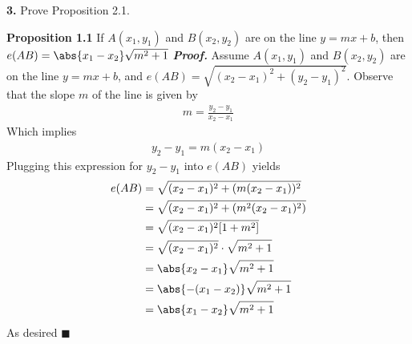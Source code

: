 \documentclass{report}
\begin{document}
    \begin{mdframed}
        \textbf{3.} Prove Proposition 2.1.
    \end{mdframed}
    \bigbreak \noindent 
    \textbf{Proposition 1.1} If $A(x_{1}, y_{1})$ and $B(x_{2}, y_{2}) $ are on the line $y=mx+b$, then $e(AB) = \abs{x_{1} - x_{2}}\sqrt{m^{2} + 1}$
    \bigbreak \noindent 
    \textbf{\textit{Proof.}} Assume $A(x_{1}, y_{1})$ and $B(x_{2}, y_{2}) $ are on the line $y=mx+b$, and $e(AB) = \sqrt{(x_{2} - x_{1})^{2} + (y_{2} - y_{1})^{2}}$. Observe that the slope $m$ of the line is given by
    \begin{align*}
        m = \frac{y_{2} - y_{1}}{x_{2} - x_{1}}
    \end{align*}
    Which implies 
    \begin{align*}
        y_{2} - y_{1} = m(x_{2} - x_{1})
    \end{align*}
    Plugging this expression for $y_{2} -y_{1}$ into $e(AB)$ yields
    \begin{align*}
        e(AB) &= \sqrt{(x_{2} - x_{1})^{2} + (m(x_{2}-x_{1}))^{2}} \\
              &= \sqrt{(x_{2} - x_{1})^{2} + (m^{2}(x_{2}-x_{1})^{2})} \\
              &= \sqrt{(x_{2}-x_{1})^{2}[1 + m^{2}]} \\
              &= \sqrt{(x_{2} - x_{1})^{2}} \cdot \sqrt{m^{2} + 1} \\
              &= \abs{x_{2} - x_{1}} \sqrt{m^{2} + 1}  \\
              &= \abs{-(x_{1} - x_{2})} \sqrt{m^{2} + 1}  \\
              &= \abs{x_{1} - x_{2}} \sqrt{m^{2} + 1}  \\
    \end{align*}
    As desired \hspace*{\fill}$\blacksquare$ 
\end{document}
